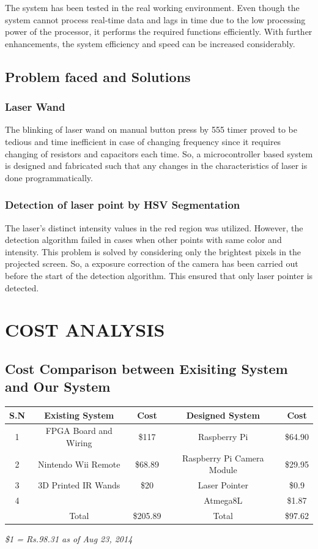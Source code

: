 \documentclass[12pt, a4paper]{article}
\begin{document}
   The system has been tested in the real working environment. Even though the system cannot process real-time data and lags in time due to the low processing power of the processor, it performs the required functions efficiently. With further enhancements, the system efficiency and speed can be increased considerably. 
   
\subsection{Problem faced and Solutions}
\subsubsection{Laser Wand}

The blinking of laser wand on manual button press by 555 timer proved to be tedious and time inefficient in case of changing frequency since it requires changing of resistors and capacitors each time. So, a microcontroller based system is designed and fabricated such that any changes in the characteristics of laser is done programmatically. 

\subsubsection{Detection of laser point by HSV Segmentation}

The laser’s distinct intensity values in the red region was utilized. However, the detection algorithm failed in cases when other points with same color and intensity. This problem is solved by considering only the brightest pixels in the projected screen. So, a exposure correction of the camera has been carried out before the start of the detection algorithm. This ensured that only laser pointer is detected.
\newpage
\section{COST ANALYSIS}
\subsection{Cost Comparison between Exisiting System and Our System}
\begin{tabular}{|c|c|c|c|c|}
\hline
	S.N  & Existing System & Cost & Designed System & Cost\\
\hline
	1 & FPGA Board and Wiring & \$117 & Raspberry Pi & \$64.90\\
\hline
	2 & Nintendo Wii Remote & \$68.89 & Raspberry Pi Camera Module & \$29.95 \\
\hline
	3 & 3D Printed IR Wands & \$20 & Laser Pointer & \$0.9\\
\hline
	4 &  &  & Atmega8L & \$1.87\\
\hline
	 & Total & \$205.89 & Total & \$97.62\\
\hline
\end{tabular}
\newline
\emph{\$1 = Rs.98.31 as of Aug 23, 2014}
\end{document}
